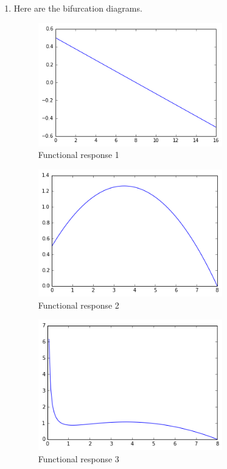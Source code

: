 \documentclass[a4paper,12pt]{article}
\begin{document}
\begin{enumerate}
\item
Here are the bifurcation diagrams.

\vspace{3cm}

\begin{figure}[H] 
	\includegraphics[width=8cm]{som11}
	\caption{Functional response 1}
\end{figure}

\vspace{3cm}
\begin{figure}[H] 

	\includegraphics[width=8cm]{som12}
	\caption{Functional response 2}
\end{figure}

\vspace{3cm}

\begin{figure}[H] 
	\includegraphics[width=8cm]{som13}
	\caption{Functional response 3}
\end{figure}


\end{enumerate}
\end{document}
